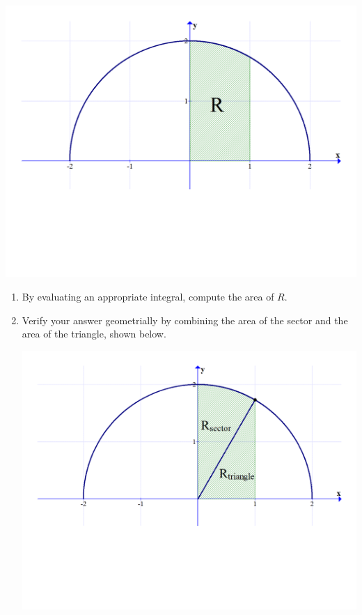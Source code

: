 \documentclass[12pt]{article}
\newif\ifans
\begin{document}
\begin{enumerate}
\begin{center}
\includegraphics[scale=0.5]{area.pdf}
\end{center}

\begin{enumerate}

\item By evaluating an appropriate integral, compute the area of $R$.

\ifans{\fbox{$A=\int_0^1 \sqrt{4-x^2} \,dx=\frac{\pi}{3}+\frac{\sqrt{3}}{2}$}} \fi

\item Verify your answer geometrially by combining the area of the sector and the area of the triangle, shown below.

\begin{center}
\includegraphics[scale=0.5]{area2.pdf}
\end{center}

\ifans{\fbox{$R_{\text{Triangle}}=\frac{1}{2}bh=\frac{1}{2}(1)\left(\sqrt{3}\right)=\frac{\sqrt{3}}{2}$; $R_{\text{Sector}}=\frac{1}{2}r^2\theta=\frac{1}{2}(2)^2\left(\frac{\pi}{6}\right)=\frac{\pi}{3}$}} \fi

\end{enumerate}

\end{enumerate}
\end{document}
